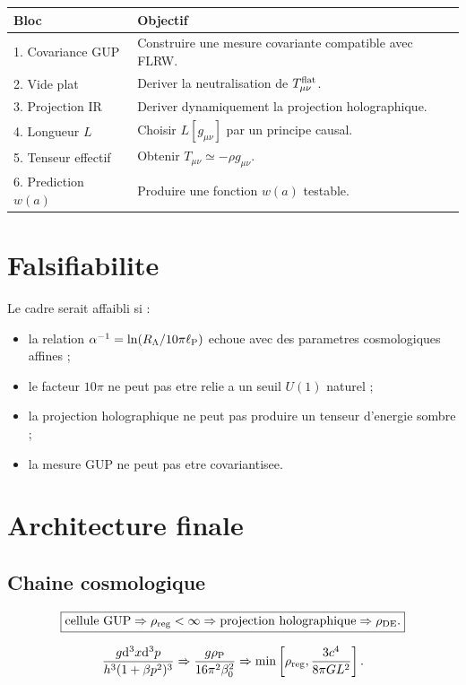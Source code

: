 \documentclass[11pt,a4paper]{article}
\newcommand{\lp}{\ell_{\rm P}}
\newcommand{\rp}{\rho_{\rm P}}
\newcommand{\rhoreg}{\rho_{\rm reg}}
\newcommand{\RL}{R_\Lambda}
\newcommand{\dif}{\mathrm d}
\begin{document}
\begin{longtable}{@{}p{3.5cm}p{11cm}@{}}
\toprule
Bloc & Objectif \\
\midrule
1. Covariance GUP & Construire une mesure covariante compatible avec FLRW. \\
2. Vide plat & Deriver la neutralisation de \(T_{\mu\nu}^{\rm flat}\). \\
3. Projection IR & Deriver dynamiquement la projection holographique. \\
4. Longueur \(L\) & Choisir \(L[g_{\mu\nu}]\) par un principe causal. \\
5. Tenseur effectif & Obtenir \(T_{\mu\nu}\simeq-\rho g_{\mu\nu}\). \\
6. Prediction \(w(a)\) & Produire une fonction \(w(a)\) testable. \\
\bottomrule
\end{longtable}

\section{Falsifiabilite}

Le cadre serait affaibli si :
\begin{itemize}
\item la relation \(\alpha^{-1}=\ln(\RL/10\pi\lp)\) echoue avec des parametres cosmologiques affines ;
\item le facteur \(10\pi\) ne peut pas etre relie a un seuil \(U(1)\) naturel ;
\item la projection holographique ne peut pas produire un tenseur d'energie sombre ;
\item la mesure GUP ne peut pas etre covariantisee.
\end{itemize}

\section{Architecture finale}

\subsection{Chaine cosmologique}

\begin{equation}
\boxed{
\text{cellule GUP}\Rightarrow \rhoreg<\infty
\Rightarrow \text{projection holographique}
\Rightarrow \rho_{\rm DE}.
}
\end{equation}

\begin{equation}
\frac{g\dif^3x\dif^3p}{h^3(1+\beta p^2)^3}
\Rightarrow
\frac{g\rp}{16\pi^2\beta_0^2}
\Rightarrow
\min\left[\rhoreg,\frac{3c^4}{8\pi GL^2}\right].
\end{equation}
\end{document}
